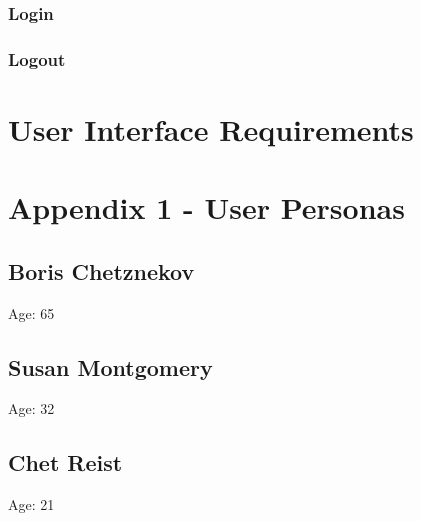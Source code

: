 \documentclass[a4paper,12pt]{article}
\begin{document}
\subsubsection{Login}

\subsubsection{Logout}

\section*{User Interface Requirements}

\newpage 
\section*{Appendix 1 - User Personas}
\subsection*{Boris Chetznekov}
Age: 65
\subsection*{Susan Montgomery}
Age: 32
\subsection*{Chet Reist}
Age: 21
\end{document}

